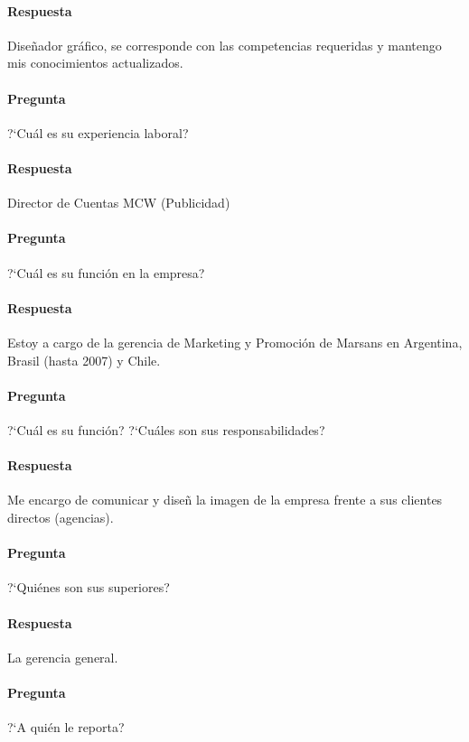 \documentclass[12pt,a4paper,spanish]{article}
\begin{document}
	\paragraph{Respuesta}
	Dise\~{n}ador gr\'afico, se corresponde con las competencias requeridas y mantengo mis conocimientos actualizados.

	\paragraph{Pregunta}
	 ?`Cu\'al es su experiencia laboral?
	\paragraph{Respuesta}
	Director de Cuentas MCW (Publicidad)

	\paragraph{Pregunta}
	 ?`Cu\'al es su funci\'on en la empresa?
	\paragraph{Respuesta}
	Estoy a cargo de la gerencia de Marketing y Promoci\'on de Marsans en Argentina, Brasil (hasta 2007) y Chile.
	
	\paragraph{Pregunta}
	 ?`Cu\'al es su funci\'on?  ?`Cu\'ales son sus responsabilidades?
	\paragraph{Respuesta}
	Me encargo de comunicar y dise\~{n} la imagen de la empresa frente a sus clientes directos (agencias).
	
	\paragraph{Pregunta}
	 ?`Qui\'enes son sus superiores? 
	\paragraph{Respuesta}
	La gerencia general.

	\paragraph{Pregunta}
	 ?`A qui\'en le reporta?
\end{document}
